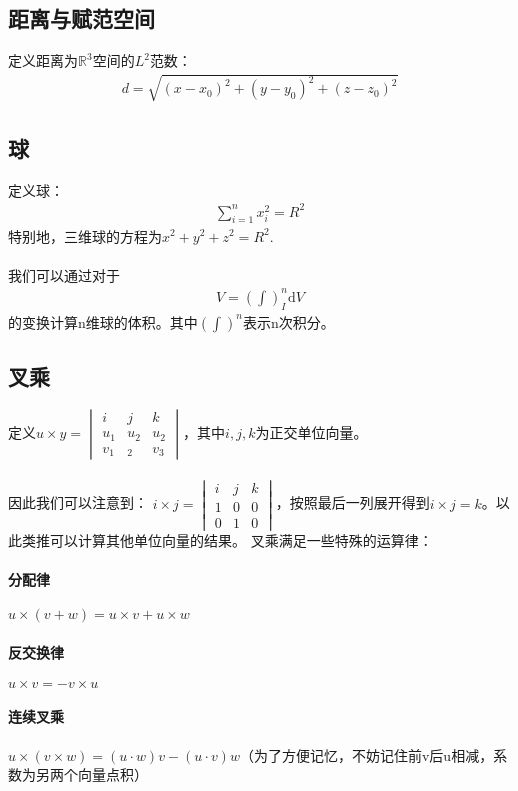 \documentclass[12pt,a4paper,UTF8]{ctexbook}
\theoremstyle{plain}
\begin{document}
\subsection{距离与赋范空间}
定义距离为$\mathbb{R}^3$空间的$L^2$范数：
\begin{align*}
    d=\sqrt{(x-x_0)^2+(y-y_0)^2+(z-z_0)^2}
\end{align*}
\subsection{球}
定义球：
\begin{align*}
    \sum_{i=1}^n x_i^2 =R^2
\end{align*}
特别地，三维球的方程为$x^2+y^2+z^2=R^2$.
\paragraph{}我们可以通过对于
\begin{align*}
    V=(\int)^n_{I}\mathrm dV
\end{align*}
的变换计算n维球的体积。其中$(\int)^n$表示n次积分。
\subsection{叉乘}
定义$u\times y=
\begin{vmatrix}
    i&j&k\\
    u_1&u_2&u_2\\
    v_1&_2&v_3
\end{vmatrix}$，其中$i,j,k$为正交单位向量。
\paragraph{}因此我们可以注意到：
$i\times j=\begin{vmatrix}
    i&j&k\\
    1&0&0\\
    0&1&0
\end{vmatrix}$，按照最后一列展开得到$i\times j =k$。以此类推可以计算其他单位向量的结果。
叉乘满足一些特殊的运算律：
\paragraph{分配律}$u\times(v+w)=u\times v +u\times w$
\paragraph{反交换律}$u\times v=-v\times u$
\paragraph{连续叉乘}$u\times(v\times w)=(u\cdot w)v-(u\cdot v)w$（为了方便记忆，不妨记住前v后u相减，系数为另两个向量点积）
\end{document}
